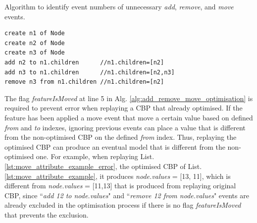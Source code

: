 \documentclass{llncs}
\begin{document}
\begin{algorithm}[H]
\begin{small}
\end{small}
\caption{Algorithm to identify event numbers of unnecessary \emph{add}, \emph{remove}, and \emph{move} events.}
\label{alg:add_remove_move_optimisation}
\end{algorithm}

\begin{lstlisting}[style=eol,caption={Example of CBP representation of attribute \emph{values}'s add and remove operations.},label=lst:add_remove_move_reference]
create n1 of Node
create n2 of Node
create n3 of Node
add n2 to n1.children      //n1.children=[n2] 
add n3 to n1.children      //n1.children=[n2,n3] 
remove n3 from n1.children //n1.children=[n2] 
\end{lstlisting}

The flag \emph{featureIsMoved} at line 5 in Alg. \ref{alg:add_remove_move_optimisation} is required to prevent error when replaying a CBP that already optimised. If the feature has been applied a move event that move a certain value based on defined \emph{from} and \emph{to} indexes, ignoring previous events can place a value that is different from the non-optimised CBP on the defined \emph{from} index. Thus, replaying the optimised CBP can produce an eventual model that is different from the non-optimised one. For example, when replaying List. \ref{lst:move_attribute_example_error}, the optimised CBP of List. \ref{lst:move_attribute_example}, it produces \emph{node.values} = [13, 11], which is different from \emph{node.values} = [11,13]  that is produced from replaying original CBP, since ``\emph{add 12 to node.values}" and ``\emph{remove 12 from node.values}" events are already excluded in the optimisation process if there is no flag \emph{featureIsMoved} that prevents the exclusion.
\end{document}
